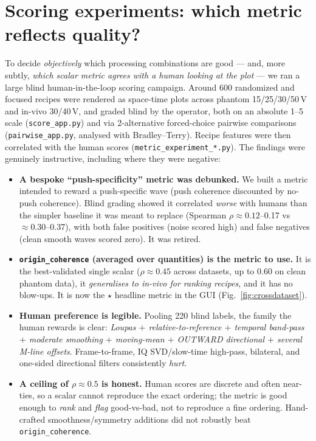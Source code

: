 \documentclass[11pt,a4paper]{article}
\newcommand{\good}[1]{\textcolor{green!45!black}{\textbf{#1}}}
\newcommand{\caveat}[1]{\textcolor{orange!75!black}{\textbf{#1}}}
\begin{document}
\section{Scoring experiments: which metric reflects quality?}\label{sec:scoring}
To decide \emph{objectively} which processing combinations are good --- and, more subtly, \emph{which scalar
metric agrees with a human looking at the plot} --- we ran a large blind human-in-the-loop scoring campaign.
Around 600 randomized and focused recipes were rendered as space-time plots across phantom 15/25/30/50\,V and
in-vivo 30/40\,V, and graded blind by the operator, both on an absolute 1--5 scale
(\texttt{score\_app.py}) and via 2-alternative forced-choice pairwise comparisons
(\texttt{pairwise\_app.py}, analysed with Bradley--Terry). Recipe features were then correlated with the
human scores (\texttt{metric\_experiment\_*.py}). The findings were genuinely instructive, including where
they were negative:

\begin{itemize}
  \item \caveat{A bespoke ``push-specificity'' metric was debunked.} We built a metric intended to reward a
  push-specific wave (push coherence discounted by no-push coherence). Blind grading showed it correlated
  \emph{worse} with humans than the simpler baseline it was meant to replace (Spearman $\rho\approx0.12$--0.17
  vs $\approx0.30$--0.37), with both false positives (noise scored high) and false negatives (clean smooth
  waves scored zero). It was retired.
  \item \good{\texttt{origin\_coherence} (averaged over quantities) is the metric to use.} It is the
  best-validated single scalar ($\rho\approx0.45$ across datasets, up to $0.60$ on clean phantom data), it
  \emph{generalises to in-vivo for ranking recipes}, and it has no blow-ups. It is now the $\star$ headline
  metric in the GUI (Fig.~\ref{fig:crossdataset}).
  \item \good{Human preference is legible.} Pooling 220 blind labels, the family the human rewards is clear:
  \emph{Loupas $+$ relative-to-reference $+$ temporal band-pass $+$ moderate smoothing $+$ moving-mean $+$
  OUTWARD directional $+$ several M-line offsets}. Frame-to-frame, IQ SVD/slow-time high-pass, bilateral,
  and one-sided directional filters consistently \emph{hurt}.
  \item \caveat{A ceiling of $\rho\approx0.5$ is honest.} Human scores are discrete and often near-ties, so a
  scalar cannot reproduce the exact ordering; the metric is good enough to \emph{rank} and \emph{flag}
  good-vs-bad, not to reproduce a fine ordering. Hand-crafted smoothness/symmetry additions did not robustly
  beat \texttt{origin\_coherence}.
\end{itemize}
\end{document}
